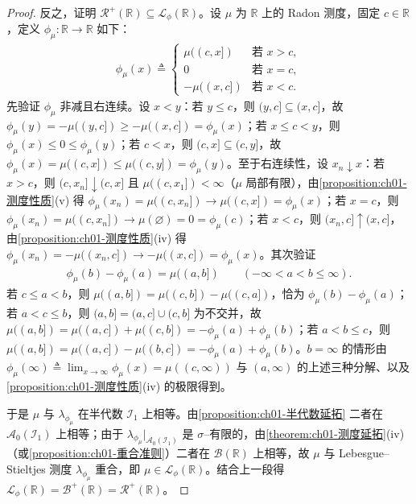 \documentclass[../../main.tex]{subfiles}%
\begin{document}
\begin{proof}
反之，证明 $\mathcal{R}^+(\mathbb{R})\subseteq\mathcal{L}_\phi(\mathbb{R})$。设 $\mu$ 为 $\mathbb{R}$ 上的 Radon 测度，固定 $c\in\mathbb{R}$，定义 $\phi_\mu:\mathbb{R}\to\mathbb{R}$ 如下：
\begin{align}
\phi_\mu(x)\triangleq
\begin{cases}
\mu((c,x]) & \text{若 }x>c,\\
0 & \text{若 }x=c,\\
-\mu((x,c]) & \text{若 }x<c.
\end{cases} 
\label{align:ch01-分布函数}
\end{align}
先验证 $\phi_\mu$ 非减且右连续。设 $x<y$：若 $y\leqslant c$，则 $(y,c]\subseteq(x,c]$，故 $\phi_\mu(y)=-\mu((y,c])\geqslant-\mu((x,c])=\phi_\mu(x)$；若 $x\leqslant c<y$，则 $\phi_\mu(x)\leqslant0\leqslant\phi_\mu(y)$；若 $c<x$，则 $(c,x]\subseteq(c,y]$，故 $\phi_\mu(x)=\mu((c,x])\leqslant\mu((c,y])=\phi_\mu(y)$。至于右连续性，设 $x_n\downarrow x$：若 $x>c$，则 $(c,x_n]\downarrow(c,x]$ 且 $\mu((c,x_1])<\infty$（$\mu$ 局部有限），由\cref{proposition:ch01-测度性质}(v) 得 $\phi_\mu(x_n)=\mu((c,x_n])\to\mu((c,x])=\phi_\mu(x)$；若 $x=c$，则 $\phi_\mu(x_n)=\mu((c,x_n])\to\mu(\varnothing)=0=\phi_\mu(c)$；若 $x<c$，则 $(x_n,c]\uparrow(x,c]$，由\cref{proposition:ch01-测度性质}(iv) 得 $\phi_\mu(x_n)=-\mu((x_n,c])\to-\mu((x,c])=\phi_\mu(x)$。其次验证
\begin{align*}
\phi_\mu(b)-\phi_\mu(a)=\mu((a,b])\qquad(-\infty<a<b\leqslant\infty).
\end{align*}
若 $c\leqslant a<b$，则 $\mu((a,b])=\mu((c,b])-\mu((c,a])$，恰为 $\phi_\mu(b)-\phi_\mu(a)$；若 $a<c\leqslant b$，则 $(a,b]=(a,c]\cup(c,b]$ 为不交并，故 $\mu((a,b])=\mu((a,c])+\mu((c,b])=-\phi_\mu(a)+\phi_\mu(b)$；若 $a<b\leqslant c$，则 $\mu((a,b])=\mu((a,c])-\mu((b,c])=-\phi_\mu(a)+\phi_\mu(b)$。$b=\infty$ 的情形由 $\phi_\mu(\infty)\triangleq\lim_{x\to\infty}\phi_\mu(x)=\mu((c,\infty))$ 与 $(a,\infty)$ 的上述三种分解、以及\cref{proposition:ch01-测度性质}(iv) 的极限得到。

于是 $\mu$ 与 $\lambda_{\phi_\mu}$ 在半代数 $\mathcal{I}_1$ 上相等。由\cref{proposition:ch01-半代数延拓} 二者在 $\mathcal{A}_0(\mathcal{I}_1)$ 上相等；由于 $\lambda_{\phi_\mu}|_{\mathcal{A}_0(\mathcal{I}_1)}$ 是 $\sigma$--有限的，由\cref{theorem:ch01-测度延拓}(iv)（或\cref{proposition:ch01-重合准则}）二者在 $\mathcal{B}(\mathbb{R})$ 上相等，故 $\mu$ 与 Lebesgue--Stieltjes 测度 $\lambda_{\phi_\mu}$ 重合，即 $\mu\in\mathcal{L}_\phi(\mathbb{R})$。结合上一段得 $\mathcal{L}_\phi(\mathbb{R})=\mathcal{B}^+(\mathbb{R})=\mathcal{R}^+(\mathbb{R})$。
\end{proof}
\end{document}
